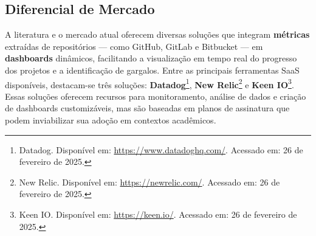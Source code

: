 \documentclass[
	12pt,           %
	openright,      %
	oneside,        %
	a4paper,        %
	brazil          %
]{abntex2}
\begin{document}
\subsection{Diferencial de Mercado}

A literatura e o mercado atual oferecem diversas soluções que integram \textbf{métricas} extraídas de repositórios — como GitHub, GitLab e Bitbucket — em \textbf{dashboards} dinâmicos, facilitando a visualização em tempo real do progresso dos projetos e a identificação de gargalos. Entre as principais ferramentas SaaS disponíveis, destacam-se três soluções: \textbf{Datadog}\footnote{Datadog. Disponível em: \url{https://www.datadoghq.com/}. Acessado em: 26 de fevereiro de 2025.}, \textbf{New Relic}\footnote{New Relic. Disponível em: \url{https://newrelic.com/}. Acessado em: 26 de fevereiro de 2025.} e \textbf{Keen IO}\footnote{Keen IO. Disponível em: \url{https://keen.io/}. Acessado em: 26 de fevereiro de 2025.}. Essas soluções oferecem recursos para monitoramento, análise de dados e criação de dashboards customizáveis, mas são baseadas em planos de assinatura que podem inviabilizar sua adoção em contextos acadêmicos.
\end{document}
